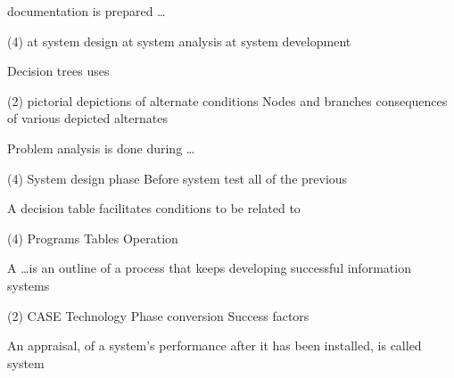\documentclass{article}
\begin{document}
\begin{questions}
\begin{exercise}
\begin{choice}
        \end{choice}
    \end{exercise}
    \begin{exercise}
        documentation is prepared \dots
        \begin{choice}(4)
            \choice {}
            \choice at system design
            \choice at system analysis
            \choice at system development
        \end{choice}
    \end{exercise}
    \begin{exercise}
        Decision trees uses
        \begin{choice}(2)
            \choice pictorial depictions of alternate conditions
            \choice Nodes and branches
            \choice consequences of various depicted alternates
            \choice {}
        \end{choice}
    \end{exercise}
    \begin{exercise}
        Problem analysis is done during \dots
        \begin{choice}(4)
            \choice System design phase
            \choice {}
            \choice Before system test
            \choice all of the previous
        \end{choice}
    \end{exercise}
    \begin{exercise}
        A decision table facilitates conditions to be related to
        \begin{choice}(4)
            \choice {}
            \choice Programs
            \choice Tables
            \choice Operation
        \end{choice}
    \end{exercise}
    \begin{exercise}
        A \dots is an outline of a process that keeps developing successful information systems
        \begin{choice}(2)
            \choice {}
            \choice CASE Technology
            \choice Phase conversion
            \choice Success factors
        \end{choice}
    \end{exercise}
    \begin{exercise}
        An appraisal, of a system's performance after it has been installed, is called system

\end{exercise}
\end{questions}
\end{document}
